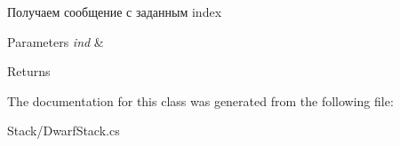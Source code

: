 Получаем сообщение с заданным index 


\begin{DoxyParams}{Parameters}
{\em ind} & \\
\hline
\end{DoxyParams}
\begin{DoxyReturn}{Returns}

\end{DoxyReturn}


The documentation for this class was generated from the following file\+:\begin{DoxyCompactItemize}
\item 
Stack/Dwarf\+Stack.\+cs\end{DoxyCompactItemize}
